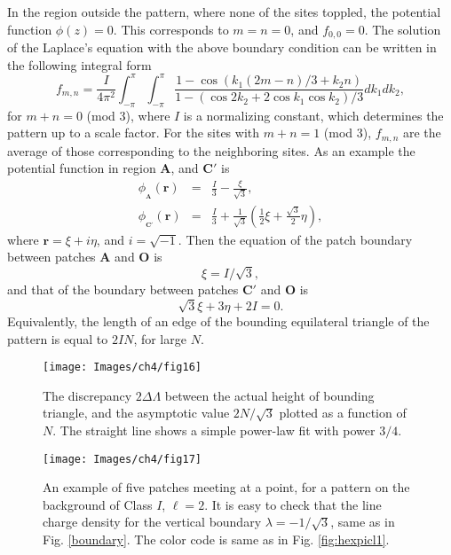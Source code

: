 \documentclass[11pt,a4paper]{book}
\begin{document}
In the region outside the pattern, where none of the sites toppled, the potential function $\phi\left( z \right)=0$. This corresponds to $m =n =0$, and $f_{0,0}=0$. The solution of the Laplace's equation with the above
boundary condition can be written in the following integral form \cite{atkinson}
\begin{equation}
f_{m,n}=\frac{I}{4\pi^{2}}\int_{-\pi}^{\pi}\int_{-\pi}^{\pi}\frac{1-\cos\left(
k_{1}(2m-n)/3+k_{2}n \right)}{1-\left(
\cos{2k_{2}}+2\cos{k_{1}}\cos{k_{2}} \right)/3}dk_{1}dk_{2},
\label{solution}
\end{equation}
for $m+n=0$ (mod $3$),
where $I$ is a normalizing constant, which determines the pattern up to
a scale factor. For the
sites with $m+n=1$ (mod $3$), $f_{m,n}$
are the average of those corresponding to the neighboring sites. As an
example the potential function in region $\textbf{A}$, and $\textbf{C}'$ is
\begin{eqnarray}
\phi_{_{\textbf{A}}}(\mathbf{r})&=&\frac{I}{3}-\frac{\xi}{\sqrt{3}}, \\
\phi_{_{\textbf{C}'}}(\mathbf{r})&=&\frac{I}{3}+\frac{1}{\sqrt{3}}\left( \frac{1}{2}\xi +
\frac{\sqrt{3}}{2}\eta \right),
\end{eqnarray}
where $\mathbf{r}=\xi+i \eta$, and $i=\sqrt{-1}$.
Then the equation of the patch boundary between patches $\textbf{A}$ and $\textbf{O}$ is
\begin{equation}
\xi=I/\sqrt{3},
\label{eq:aob}
\end{equation}
and that of the boundary between patches $\textbf{C}'$ and $\textbf{O}$ is
\begin{equation}
\sqrt{3}\xi+3\eta+2I=0.
\end{equation}
Equivalently, the length of an edge of the bounding
equilateral triangle of the pattern is equal to $2I N$, for large
$N$.
%
\begin{SCfigure}
\texttt{[image: Images/ch4/fig16]}
\caption{The discrepancy $2 \Delta \Lambda$ between the actual height
of bounding triangle, and the asymptotic value $2 N/\sqrt{3}$ plotted
as a function of $N$. The straight line shows a simple power-law fit
with power $3/4$.}
\label{fig:diffdia}
\end{SCfigure}
%
%
\begin{SCfigure}
\texttt{[image: Images/ch4/fig17]}
\caption{An example of five patches meeting at a point, for a
pattern on the background of Class $I$, $\ell=2$. It is easy to check
that the line charge density for the vertical boundary
$\lambda=-1/\sqrt{3}$, same as in Fig. \ref{boundary}. The color code
is same as in Fig. \ref{fig:hexpicl1}.}
\label{fig:pb2}
\end{SCfigure}
%
\end{document}
